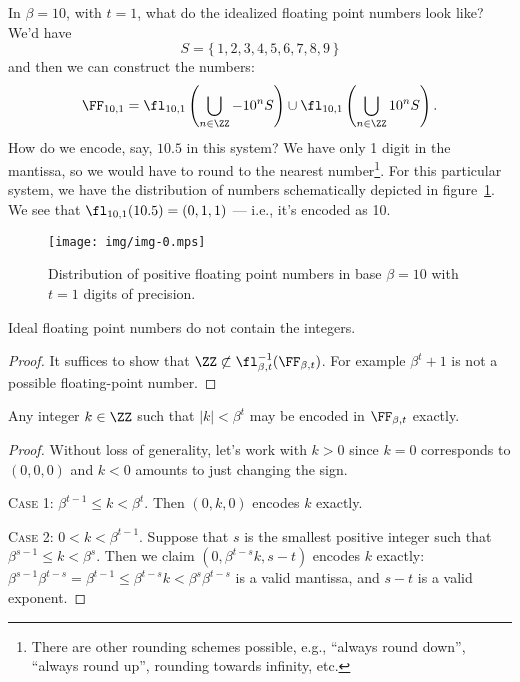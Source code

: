 \begin{ex}\label{ex:idealized-floating-point:eleven-point-five}
  In $\beta=10$, with $t=1$, what do the idealized floating point numbers
  look like? We'd have
  \begin{equation}
    S = \{\,1,2,3,4,5,6,7,8,9\,\}
  \end{equation}
  and then we can construct the numbers:
  \begin{equation}
    \FF_{10,1} = \fl_{10,1}\left(\bigcup_{n\in\ZZ}-10^{n}S\right)\cup
    \fl_{10,1}\left(\bigcup_{n\in\ZZ}10^{n}S\right).
  \end{equation}
  How do we encode, say, $10.5$ in this system? We have only 1 digit in
  the mantissa, so we would have to round to the nearest
  number\footnote{There are other rounding schemes possible, e.g.,
  ``always round down'', ``always round up'', rounding towards infinity,
  etc.}. For this particular system, we have the distribution of numbers
  schematically depicted in figure~\ref{fig:img-0}. We see that
  $\fl_{10,1}(10.5)=(0,1,1)$ --- i.e., it's encoded as 10.

  \begin{figure}[t]\label{fig:img-0}
    \centering
    \texttt{[image: img/img-0.mps]}
    \caption{Distribution of positive floating point numbers in base
      $\beta=10$ with $t=1$ digits of precision.}
  \end{figure}
\end{ex}

\begin{thm}
Ideal floating point numbers do not contain the integers.
\end{thm}
\begin{proof}
It suffices to show that $\ZZ\not\subset\fl_{\beta,t}^{-1}(\FF_{\beta,t})$.
For example $\beta^{t}+1$ is not a possible floating-point number.
\end{proof}
\begin{cor}\label{cor:ideal-floats:ints-representable-by-floats}
Any integer $k\in\ZZ$ such that $|k|<\beta^{t}$ may be encoded in
$\FF_{\beta,t}$ exactly.
\end{cor}
\begin{proof}
  Without loss of generality, let's work with $k>0$ since $k=0$
  corresponds to $(0,0,0)$ and $k<0$ amounts to just changing the sign.

  \textsc{Case 1:} $\beta^{t-1}\leq k<\beta^{t}$. Then $(0,k,0)$ encodes
  $k$ exactly.

  \textsc{Case 2:} $0<k<\beta^{t-1}$. Suppose that $s$ is the smallest
  positive integer such that $\beta^{s-1}\leq k<\beta^{s}$. Then we
  claim $(0, \beta^{t-s}k, s-t)$ encodes $k$ exactly:
  $\beta^{s-1}\beta^{t-s}=\beta^{t-1}\leq \beta^{t-s}k < \beta^{s}\beta^{t-s}$
  is a valid mantissa, and $s-t$ is a valid exponent.
\end{proof}

